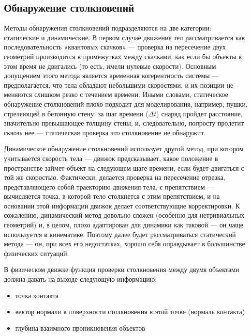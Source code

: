 \subsection{Обнаружение столкновений}
Методы обнаружения столкновений подразделяются на две категории: статические и динамические. В первом случае
движение тел рассматривается как последовательность «квантовых скачков» --- проверка на пересечение двух геометрий
производится в промежутках между скачками, как если бы объекты в этом время не двигались (то есть, имели нулевые
скорости). Основным допущением этого метода является временная когерентность системы --- предполагается, что тела
обладают небольшими скоростями, и их позиции не меняются слишком резко с течением времени. Иными словами,
статическое обнаружение столкновений плохо подходит для моделирования, например, пушки, стреляющей в бетонную
стену: за шаг времени ($\Delta{t}$) снаряд пройдет расстояние, значительно превышающее толщину стены, и, следовательно,
попросту пролетит сквозь нее --- статическая проверка это столкновение не обнаружит.

Динамическое обнаружение столкновений\cite{Ericson} использует другой метод, при котором учитывается скорость тела --- движок
предсказывает, какое положение в пространстве займет объект на следующем шаге времени, если будет двигаться с той же
скоростью. Фактически, делается проверка на пересечение отрезка, представляющего собой траекторию движения тела, с
препятствием --- вычисляется точка, в которой тело столкнется с этим препятствием, и на основании этой информации движок
делает соответствующие корректировки. К сожалению, динамический метод довольно сложен (особенно для
нетривиальных геометрий) и, в целом, плохо адаптирован для динамики как таковой --- он чаще используется в кинематике.
Поэтому далее будет рассматриваться статический метода --- он, при всех его недостатках, хорошо себя оправдывает в
большинстве физических ситуаций.

В физическом движке функция проверки столкновения между двумя объектами должна давать на выходе следующую
информацию:
\begin{itemize}
  \item точка контакта
  \item вектор нормали к поверхности столкновения в этой точке (нормаль контакта)
  \item глубина взаимного проникновения объектов
\end{itemize}

